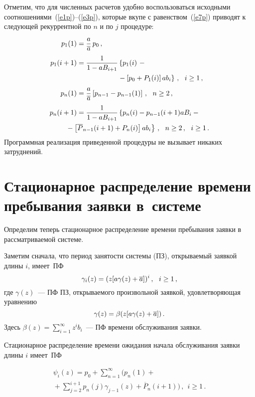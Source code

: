 \begin{multicols}{2}
Отметим, что для численных расчетов удобно воспользоваться
исходными соотношениями~(\ref{e1p})--(\ref{e3p}), которые вкупе с
равенством~(\ref{e7p}) приводят к следующей рекуррентной
по $n$ и по $j$ процедуре:
\begin{align*}
p_{1}(1) & = \fr{a}{\a}\, p_{0}\,, \\
p_{1}(i+1) & = \fr{1}{1 - a B_{i+1}}
\left \{
p_1(i)\right. -{}\notag\\
&\hspace*{40pt}\ \ \ \ \ \left.{}-\left [ p_0 + P_1(i)\right ]
ab_i \right \}\,,\  \ i\ge 1\,,\\
p_n(1) & = \fr{a}{\a}
\left [ p_{n-1} - p_{n-1}(1)\right ]\,,
\ \ n\ge 2\,,  \\
p_{n}(i+1) &=  \fr{1}{1 - a B_{i+1}}
\left \{
p_{n}(i) - p_{n-1}(i+1) a B_i  -{}\right.\\
&\left.\!\!\!\!\!\!\!\!\!\!\!{}- \left [
\overline P_{n-1}(i+1) + P_{n}(i)\right ]
a b_i \right \}\,,
\ \ n\ge 2\,,\ \ i\ge 1\,.
\end{align*}
Программная реализация приведенной процедуры не вызывает
никаких затруднений.

\vspace*{-3pt}
\section{Стационарное распределение времени
пребывания заявки в~системе}
\vspace*{-3pt}

Определим теперь стационарное распределение времени
пребывания заявки в рассматриваемой сис\-теме.

Заметим сначала, что период занятости системы (ПЗ),
открываемый заявкой длины $i$, имеет~ПФ
\begin{equation}
\gamma_i(z)     = (z[a\gamma(z)+\overline a])^i\,,
\ \ i\ge 1\,,
\label{e17p}
\end{equation}
где $\gamma(z)$~--- ПФ ПЗ, открываемого произвольной
заявкой, удовлетворяющая уравнению
\begin{equation}
\gamma(z) = \beta(z[a\gamma(z)+\overline a])\,.
\label{e18p}
\end{equation}
Здесь $ \beta(z) = \sum_{i=1}^\infty z^i b_i $~---
ПФ времени обслуживания заявки.

Стационарное распределение времени ожидания начала
обслуживания заявки длины $i$ имеет~ПФ

\noindent
\begin{multline}
\psi_i(z) = p_0 + \sum_{n=1}^\infty
\Bigg(
p_n(1) +{}\\
{}+ \sum_{j=2}^{i+1} p_n(j) \gamma_{j-1}(z) + \overline P_n(i+1)
\Bigg)\,,
\ \ i\ge 1\,.
\label{e19p}
\end{multline}


\end{multicols}
